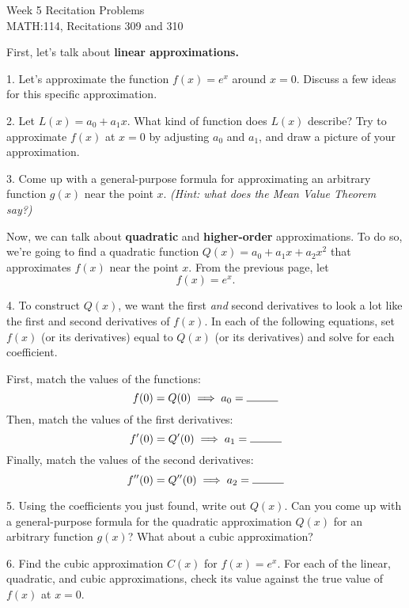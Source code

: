 \documentclass[11pt]{article}
\begin{document}
	\thispagestyle{empty}
	{
		\centering
		\huge{Week 5 Recitation Problems} \\
		\Large{MATH:114, Recitations 309 and 310} \\
	}
	\vspace{3em}
	
	First, let's talk about \textbf{linear approximations.}
	\vspace{3em}
	
	1. Let's approximate the function $f(x)=e^x$ around $x=0$. Discuss a few ideas for this specific approximation.
	
	\vspace{0.2\textheight}
	
	2. Let $L(x) = a_0 + a_1x$. What kind of function does $L(x)$ describe? Try to approximate $f(x)$ at $x=0$ by adjusting $a_0$ and $a_1$, and draw a picture of your approximation.
	
	\vspace{0.2\textheight}
	
	3. Come up with a general-purpose formula for approximating an arbitrary function $g(x)$ near the point $x$. \textit{(Hint: what does the Mean Value Theorem say?)}
	
	\newpage
	Now, we can talk about \textbf{quadratic} and \textbf{higher-order} approximations. To do so, we're going to find a quadratic function $Q(x) = a_0 + a_1x + a_2x^2$ that approximates $f(x)$ near the point $x$. From the previous page, let $$f(x) = e^x.$$
	
	4. To construct $Q(x)$, we want the first \textit{and} second derivatives to look a lot like the first and second derivatives of $f(x)$. In each of the following equations, set $f(x)$ (or its derivatives) equal to $Q(x)$ (or its derivatives) and solve for each coefficient.
	
	First, match the values of the functions: $$ f(0) = Q(0) \implies a_0 = \rule{1cm}{0.15mm} $$ Then, match the values of the first derivatives: $$ f'(0) = Q'(0) \implies a_1 = \rule{1cm}{0.15mm}$$ Finally, match the values of the second derivatives: $$ f''(0) = Q''(0) \implies a_2 = \rule{1cm}{0.15mm}$$
	
	\vspace{3em}
	5. Using the coefficients you just found, write out $Q(x)$. Can you come up with a general-purpose formula for the quadratic approximation $Q(x)$ for an arbitrary function $g(x)$? What about a cubic approximation?
	
	\vspace{0.2\textheight}
	6. Find the cubic approximation $C(x)$ for $f(x) = e^x$. For each of the linear, quadratic, and cubic approximations, check its value against the true value of $f(x)$ at $x=0$.
\end{document}
